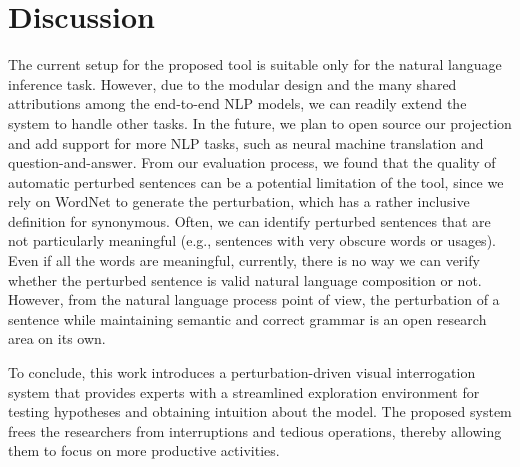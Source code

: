 \section{Discussion}
The current setup for the proposed tool is suitable only for the natural language inference task. However, due to the modular design and the many shared attributions among the end-to-end NLP models, we can readily extend the system to handle other tasks. In the future, we plan to open source our projection and add support for more NLP tasks, such as neural machine translation and question-and-answer.
%
From our evaluation process, we found that the quality of automatic perturbed sentences can be a potential limitation of the tool, since we rely on WordNet to generate the perturbation, which has a rather inclusive definition for synonymous. Often, we can identify perturbed sentences that are not particularly meaningful (e.g., sentences with very obscure words or usages). 
Even if all the words are meaningful, currently, there is no way we can verify whether the perturbed sentence is valid natural language composition or not.
%
However, from the natural language process point of view, the perturbation of a sentence while maintaining semantic and correct grammar is an open research area on its own. 

To conclude, this work introduces a perturbation-driven visual interrogation system that provides experts with a streamlined exploration environment for testing hypotheses and obtaining intuition about the model. The proposed system frees the researchers from interruptions and tedious operations, thereby allowing them to focus on more productive activities.

